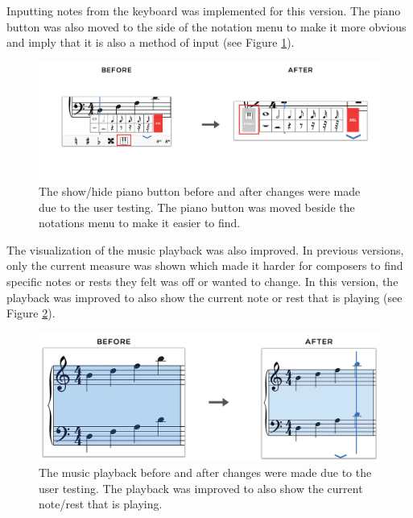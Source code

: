 				Inputting notes from the keyboard was implemented for this version. The piano button was also moved to the side of the notation menu to make it more obvious and imply that it is also a method of input (see Figure \ref{fig:before-after-pianobtn}). 

				\begin{figure}[h]
					\centering
					\includegraphics[scale=0.273]{figures/before-after-pianobtn.png}
				    \caption{The show/hide piano button before and after changes were made due to the user testing. The piano button was moved beside the notations menu to make it easier to find.}
				    \label{fig:before-after-pianobtn}
				\end{figure}

				The visualization of the music playback was also improved. In previous versions, only the current measure was shown which made it harder for composers to find specific notes or rests they felt was off or wanted to change. In this version, the playback was improved to also show the current note or rest that is playing (see Figure \ref{fig:before-after-playback}).

				\begin{figure}[h]
					\centering
					\includegraphics[scale=0.075]{figures/before-after-playback.png}
				    \caption{The music playback before and after changes were made due to the user testing. The playback was improved to also show the current note/rest that is playing.}
				    \label{fig:before-after-playback}
				\end{figure}

